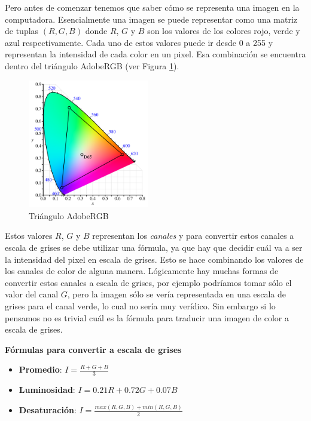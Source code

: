 Pero antes de comenzar tenemos que saber cómo se representa una imagen en la computadora. Esencialmente una imagen se
puede representar como una matriz de tuplas $(R, G, B)$ donde $R$, $G$ y $B$ son los valores de los colores rojo, verde
y azul respectivamente. Cada uno de estos valores puede ir desde 0 a 255 y representan la intensidad de cada color en un
pixel. Esa combinación se encuentra dentro del triángulo AdobeRGB (ver Figura \ref{fig:adobe_rgb}).

\begin{figure}[H]
  \centering
  \includegraphics[width=200px]{./images/adobe_rgb.png}
  \caption{Triángulo AdobeRGB}
  \label{fig:adobe_rgb}
\end{figure}

Estos valores $R$, $G$ y $B$ representan los \textit{canales} y para convertir estos canales a escala de grises se debe
utilizar una fórmula, ya que hay que decidir cuál va a ser la intensidad del pixel en escala de grises. Esto se hace
combinando los valores de los canales de color de alguna manera. Lógicamente hay muchas formas de convertir estos
canales a escala de grises, por ejemplo podríamos tomar sólo el valor del canal $G$, pero la imagen sólo se vería
representada en una escala de grises para el canal verde, lo cual no sería muy verídico. Sin embargo si lo pensamos no
es trivial cuál es la fórmula para traducir una imagen de color a escala de grises. \\

\begin{tcolorbox}[colback=mint,colframe=yellow!75!black,arc=0pt,outer arc=0pt]
  \textbf{Fórmulas para convertir a escala de grises} \\

  \begin{itemize}
    \item \textbf{Promedio}: $I = \frac{R + G + B}{3}$
    \item \textbf{Luminosidad}: $I = 0.21R + 0.72G + 0.07B$
    \item \textbf{Desaturación}: $I = \frac{max(R, G, B) + min(R, G, B)}{2}$
  \end{itemize}
\end{tcolorbox}


